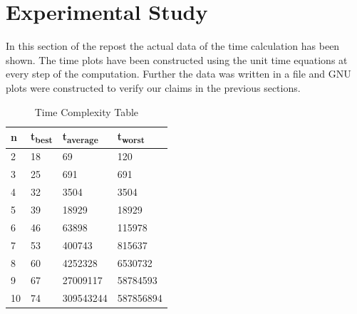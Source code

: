 \documentclass[conference]{IEEEtran}
\begin{document}
\section{Experimental Study}
In this section of the repost the actual data of the time calculation has been shown. The time plots have been constructed using the unit time equations at every step of the computation. Further the data was written in a file and GNU plots were constructed to verify our claims in the previous sections.

\begin{table}[h!]
  \begin{center}
    \caption{Time Complexity Table}
    \label{tab:table1}
    \begin{tabular}{l|l|l|l}
      \textbf{n} & \textbf{t\textsubscript{best}} & \textbf{t\textsubscript{average}} & \textbf{t\textsubscript{worst}}\\ %
      \hline
      2 & 18 & 69 & 120 \\
      3 & 25 & 691 & 691 \\
      4 & 32 & 3504 & 3504 \\
      5 & 39 & 18929 & 18929 \\
      6 & 46 & 63898 & 115978 \\
      7 & 53 & 400743 & 815637 \\
      8 & 60 & 4252328 & 6530732 \\
      9 & 67 & 27009117 & 58784593 \\
      10 & 74 & 309543244 & 587856894 \\
      
    \end{tabular}
  \end{center}
\end{table}
\end{document}
